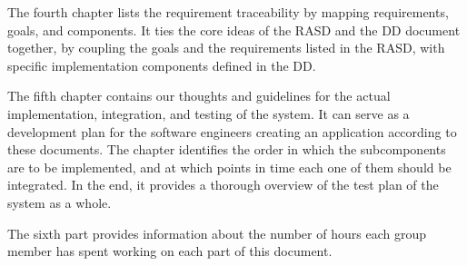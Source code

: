 The fourth chapter lists the requirement traceability by mapping requirements, goals, and components. It ties the core ideas of the RASD and the DD document together, by coupling the goals and the requirements listed in the RASD, with specific implementation components defined in the DD. \newline 

The fifth chapter contains our thoughts and guidelines for the actual implementation, integration, and testing of the system. It can serve as a development plan for the software engineers creating an application according to these documents. The chapter identifies the order in which the subcomponents are to be implemented, and at which points in time each one of them should be integrated. In the end, it provides a thorough overview of the test plan of the system as a whole. \newline

The sixth part provides information about the number of hours each group member has spent working on each part of this document. \newline

